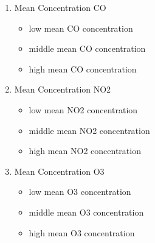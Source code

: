 \documentclass{classrep}
\begin{document}
{{\begin{enumerate}
\begin{figure}[!htbp]
                    \caption{}
                \end{figure}
                \FloatBarrier
                \item Mean Concentration CO
                \begin{itemize}
                    \item low mean CO concentration
                    \item middle mean CO concentration
                    \item high mean CO concentration
                \end{itemize}

                \item Mean Concentration NO2
                \begin{itemize}
                    \item low mean NO2 concentration
                    \item middle mean NO2 concentration
                    \item high mean NO2 concentration
                \end{itemize}

                \item Mean Concentration O3
                \begin{itemize}
                    \item low mean O3 concentration
                    \item middle mean O3 concentration
                    \item high mean O3 concentration
                \end{itemize}


\end{enumerate}}}
\end{document}
